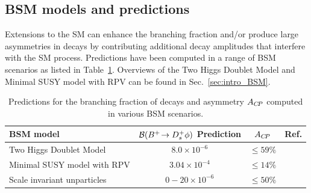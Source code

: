 


\subsection{BSM models and predictions}
Extensions to the SM can enhance the branching fraction and/or produce large \CP asymmetries in \decay{\Bp}{\Dsp\phiz} decays by contributing additional decay amplitudes that interfere with the SM process.
Predictions have been computed in a range of BSM scenarios as listed in Table~\ref{tab:theory_BSM_br}. Overviews of the Two Higgs Doublet Model and Minimal SUSY model with RPV can be found in Sec.~\ref{sec:intro_BSM}.


\begin{table}[h]
    \centering
    \begin{tabular}{ l c c c }
        \hline
        BSM model                                        & ${\mathcal{B}}({{{B}^+}}\!\rightarrow {\ensuremath{{D}^+_{s}}}\phi)$ Prediction     & $A_{{C\!P}}$&  Ref.\\
        \hline
        Two Higgs Doublet Model                          & $8.0\times10^{-6}$    & $\leq59\%$ & ~\cite{Mohanta:2002wf}        \\
        Minimal SUSY model with RPV                      & $3.04\times10^{-4}$   & $\leq14\%$ & ~\cite{Mohanta:2002wf}     \\
        Scale invariant unparticles~\cite{GEORGI2007275} & $0-20\times10^{-6}$   & $\leq50\%$ & ~\cite{Mohanta:2007uu}     \\
        \hline 
    \end{tabular}
    \caption{Predictions for the branching fraction of \decay{\Bp}{\Dsp\phiz} decays and \CP asymmetry $A_{{C\!P}}$ computed in various BSM scenarios.}
    \label{tab:theory_BSM_br}
\end{table}


